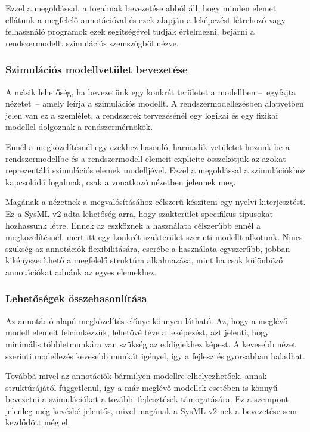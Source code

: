         Ezzel a megoldással, a fogalmak bevezetése abból áll, hogy minden elemet ellátunk a megfelelő annotációval és ezek alapján a leképezést létrehozó vagy felhasználó programok ezek segítségével tudják értelmezni, bejárni a rendszermodellt szimulációs szemszögből nézve.

        \subsubsection{Szimulációs modellvetület bevezetése}
        A másik lehetőség, ha bevezetünk egy konkrét területet a modellben --~egyfajta nézetet~-- amely leírja a szimulációs modellt.
        A rendszermodellezésben alapvetően jelen van ez a szemlélet, a rendszerek tervezésénél egy logikai és egy fizikai modellel dolgoznak a rendszermérnökök.
        
        Ennél a megközelítésnél egy ezekhez hasonló, harmadik vetületet hozunk be a rendszermodellbe és a rendszermodell elemeit explicite összekötjük az azokat reprezentáló szimulációs elemek modelljével.
        Ezzel a megoldással a szimulációkhoz kapcsolódó fogalmak, csak a vonatkozó nézetben jelennek meg.
        
        Magának a nézetnek a megvalósításához célszerű készíteni egy nyelvi kiterjesztést.
        Ez a SysML v2 adta lehetőség arra, hogy szakterület specifikus típusokat hozhassunk létre.
        Ennek az eszköznek a használata célszerűbb ennél a megközelítésnél, mert itt egy konkrét szakterület szerinti modellt alkotunk.
        Nincs szükség az annotációk flexibilitására, cserébe a használata egyszerűbb, jobban kikényszeríthető a megfelelő struktúra alkalmazása, mint ha csak különböző annotációkat adnánk az egyes elemekhez.

        \subsubsection{Lehetőségek összehasonlítása} \label{sec:ReMoOsszehasonlitas}
        Az annotáció alapú megközelítés előnye könnyen látható. Az, hogy a meglévő modell elemeit felcímkézzük, lehetővé téve a leképezést, azt jelenti, hogy minimális többletmunkára van szükség az eddigiekhez képest.
        A kevesebb nézet szerinti modellezés kevesebb munkát igényel, így a fejlesztés gyorsabban haladhat.

        Továbbá mivel az annotációk bármilyen modellre elhelyezhetőek, annak struktúrájától függetlenül, így a már meglévő modellek esetében is könnyű bevezetni a szimulációkat a további fejlesztések támogatására.
        Ez a szempont jelenleg még kevésbé jelentős, mivel magának a SysML v2-nek a bevezetése sem kezdődött még el.

